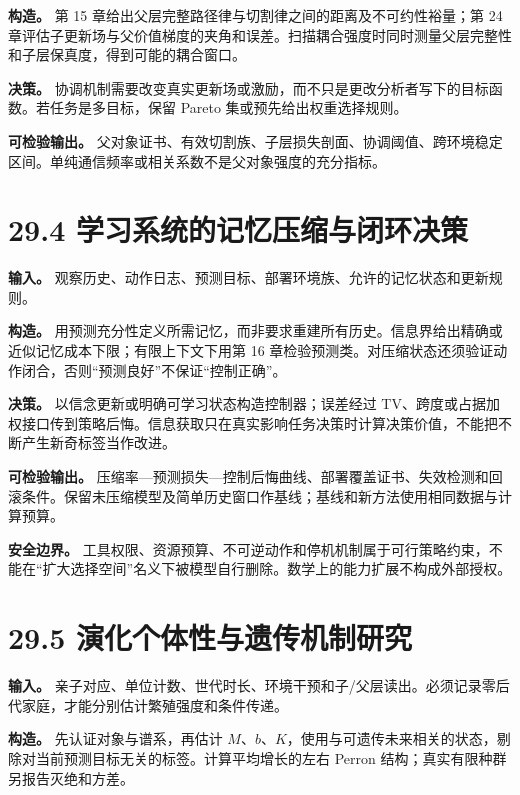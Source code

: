 \documentclass[
  11pt,
  oneside]{book}
\begin{document}
\textbf{构造。} 第 15 章给出父层完整路径律与切割律之间的距离及不可约性裕量；第 24 章评估子更新场与父价值梯度的夹角和误差。扫描耦合强度时同时测量父层完整性和子层保真度，得到可能的耦合窗口。

\textbf{决策。} 协调机制需要改变真实更新场或激励，而不只是更改分析者写下的目标函数。若任务是多目标，保留 Pareto 集或预先给出权重选择规则。

\textbf{可检验输出。} 父对象证书、有效切割族、子层损失剖面、协调阈值、跨环境稳定区间。单纯通信频率或相关系数不是父对象强度的充分指标。

\section{29.4 学习系统的记忆压缩与闭环决策}\label{ux5b66ux4e60ux7cfbux7edfux7684ux8bb0ux5fc6ux538bux7f29ux4e0eux95edux73afux51b3ux7b56}

\textbf{输入。} 观察历史、动作日志、预测目标、部署环境族、允许的记忆状态和更新规则。

\textbf{构造。} 用预测充分性定义所需记忆，而非要求重建所有历史。信息界给出精确或近似记忆成本下限；有限上下文下用第 16 章检验预测类。对压缩状态还须验证动作闭合，否则``预测良好''不保证``控制正确''。

\textbf{决策。} 以信念更新或明确可学习状态构造控制器；误差经过 TV、跨度或占据加权接口传到策略后悔。信息获取只在真实影响任务决策时计算决策价值，不能把不断产生新奇标签当作改进。

\textbf{可检验输出。} 压缩率---预测损失---控制后悔曲线、部署覆盖证书、失效检测和回滚条件。保留未压缩模型及简单历史窗口作基线；基线和新方法使用相同数据与计算预算。

\textbf{安全边界。} 工具权限、资源预算、不可逆动作和停机机制属于可行策略约束，不能在``扩大选择空间''名义下被模型自行删除。数学上的能力扩展不构成外部授权。

\section{29.5 演化个体性与遗传机制研究}\label{ux6f14ux5316ux4e2aux4f53ux6027ux4e0eux9057ux4f20ux673aux5236ux7814ux7a76}

\textbf{输入。} 亲子对应、单位计数、世代时长、环境干预和子/父层读出。必须记录零后代家庭，才能分别估计繁殖强度和条件传递。

\textbf{构造。} 先认证对象与谱系，再估计 \(M\)、\(b\)、\(K\)，使用与可遗传未来相关的状态，剔除对当前预测目标无关的标签。计算平均增长的左右 Perron 结构；真实有限种群另报告灭绝和方差。
\end{document}
